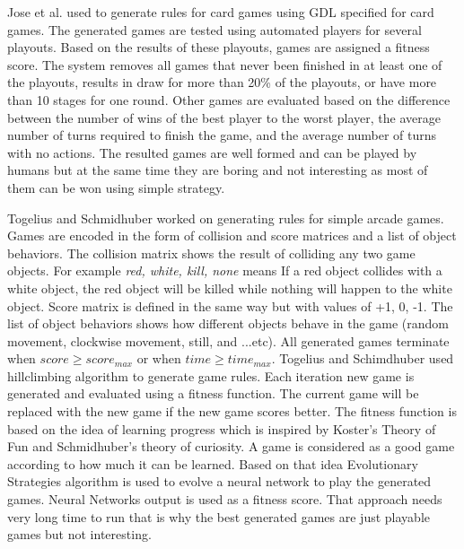 Jose et al.\cite{generationCardGames} used  to generate rules for card games using GDL specified for card games. The generated games are tested using automated players for several playouts. Based on the results of these playouts, games are assigned a fitness score. The system removes all games that never been finished in at least one of the playouts, results in draw for more than 20\% of the playouts, or have more than 10 stages for one round. Other games are evaluated based on the difference between the number of wins of the best player to the worst player, the average number of turns required to finish the game, and the average number of turns with no actions. The resulted games are well formed and can be played by humans but at the same time they are boring and not interesting as most of them can be won using simple strategy.\\\par

Togelius and Schmidhuber\cite{arcadeHillClimber} worked on generating rules for simple arcade games. Games are encoded in the form of collision and score matrices and a list of object behaviors. The collision matrix shows the result of colliding any two game objects. For example \emph{red, white, kill, none} means If a red object collides with a white object, the red object will be killed while nothing will happen to the white object. Score matrix is defined in the same way but with values of +1, 0, -1. The list of object behaviors shows how different objects behave in the game (random movement, clockwise movement, still, and ...etc). All generated games terminate when $score \geq score_{max}$ or when $time \geq time_{max}$. Togelius and Schimdhuber used hillclimbing algorithm to generate game rules. Each iteration new game is generated and evaluated using a fitness function. The current game will be replaced with the new game if the new game scores better. The fitness function is based on the idea of learning progress which is inspired by Koster's Theory of Fun\cite{theoryFun} and Schmidhuber's theory of curiosity\cite{theoryCuriousity}. A game is considered as a good game according to how much it can be learned. Based on that idea Evolutionary Strategies algorithm is used to evolve a neural network to play the generated games. Neural Networks output is used as a fitness score. That approach needs  very long time to run that is why the best generated games are just playable games but not interesting.\\\par

